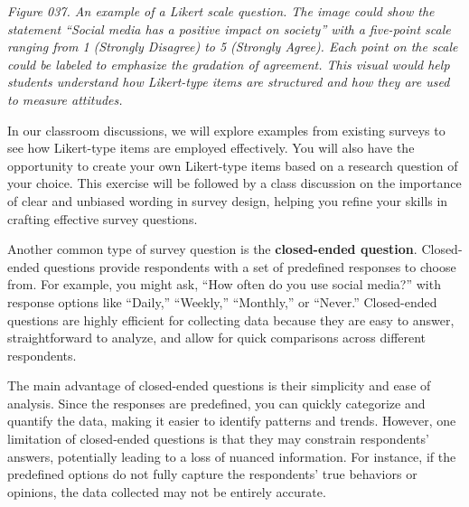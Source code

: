 \documentclass[
]{book}
\begin{document}
\emph{Figure 037. An example of a Likert scale question. The image could show the statement ``Social media has a positive impact on society'' with a five-point scale ranging from 1 (Strongly Disagree) to 5 (Strongly Agree). Each point on the scale could be labeled to emphasize the gradation of agreement. This visual would help students understand how Likert-type items are structured and how they are used to measure attitudes.}

In our classroom discussions, we will explore examples from existing surveys to see how Likert-type items are employed effectively. You will also have the opportunity to create your own Likert-type items based on a research question of your choice. This exercise will be followed by a class discussion on the importance of clear and unbiased wording in survey design, helping you refine your skills in crafting effective survey questions.

Another common type of survey question is the \textbf{closed-ended question}. Closed-ended questions provide respondents with a set of predefined responses to choose from. For example, you might ask, ``How often do you use social media?'' with response options like ``Daily,'' ``Weekly,'' ``Monthly,'' or ``Never.'' Closed-ended questions are highly efficient for collecting data because they are easy to answer, straightforward to analyze, and allow for quick comparisons across different respondents.

The main advantage of closed-ended questions is their simplicity and ease of analysis. Since the responses are predefined, you can quickly categorize and quantify the data, making it easier to identify patterns and trends. However, one limitation of closed-ended questions is that they may constrain respondents' answers, potentially leading to a loss of nuanced information. For instance, if the predefined options do not fully capture the respondents' true behaviors or opinions, the data collected may not be entirely accurate.
\end{document}
